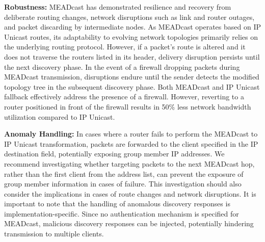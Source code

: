 \begin{itemize}
    \textbf{Robustness:}
    MEADcast has demonstrated resilience and recovery from deliberate routing
        changes, network disruptions such as link and router outages, and
        packet discarding by intermediate nodes.
    As MEADcast operates based on IP Unicast routes, its adaptability to
        evolving network topologies primarily relies on the underlying routing
        protocol.
    However, if a packet's route is altered and it does not traverse the
        routers listed in its header, delivery disruption persists until the
        next discovery phase.
    In the event of a firewall dropping packets during MEADcast transmission,
        disruptions endure until the sender detects the modified topology tree
        in the subsequent discovery phase.
    Both MEADcast and IP Unicast fallback effectively address the presence of
        a firewall.
    However, reverting to a router positioned in front of the firewall results
        in 50\% less network bandwidth utilization compared to IP Unicast.

    \textbf{Anomaly Handling:}
    In cases where a router fails to perform the MEADcast to IP Unicast
        transformation, packets are forwarded to the client specified in the IP
        destination field, potentially exposing group member IP addresses.
    We recommend investigating whether targeting packets to the next MEADcast
        hop, rather than the first client from the address list, can prevent
        the exposure of group member information in cases of failure.
    This investigation should also consider the implications in cases of route
        changes and network disruptions.
    It is important to note that the handling of anomalous discovery responses
        is implementation-specific.
    Since no authentication mechanism is specified for MEADcast, malicious
        discovery responses can be injected, potentially hindering transmission
        to multiple clients.


\end{itemize}

